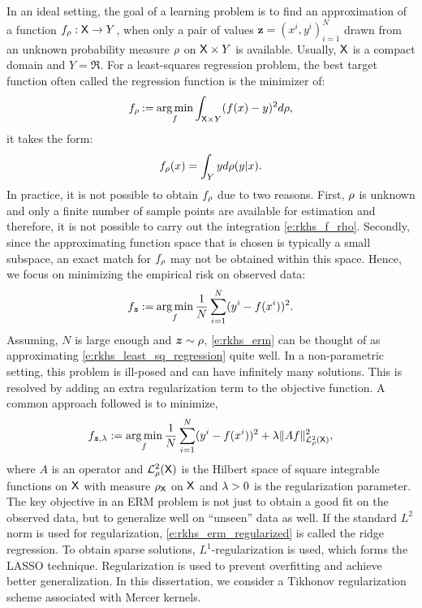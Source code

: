 In an ideal setting, the goal of a learning problem is to find an approximation of a function $f_\rho : {\sf X} \to Y$, when only a pair of values $\bm{z} = (x^i, y^i)_{i=1}^N$ drawn from an unknown probability measure $\rho$ on ${\sf X} \times Y$ is available. Usually, ${\sf X}$ is a compact domain and $Y = \Re$. For a least-squares regression problem, the best target function often called the regression function is the minimizer of:
\begin{equation}
f_\pr \eqdef \argmin_f \int_{\state \times Y} (f(x) - y) ^2 d\pr,
\label{e:rkhs_least_sq_regression}
\end{equation}
it takes the form:
\begin{equation}
f_\pr(x) = \int_Y y d\pr(y|x).
\label{e:rkhs_f_rho}
\end{equation}
In practice, it is not possible to obtain $f_\rho$ due to two reasons. First, $\rho$ is unknown and only a finite number of sample points are available for estimation and therefore, it is not possible to carry out the integration \eqref{e:rkhs_f_rho}. Secondly, since the approximating function space that is chosen is typically a small subspace, an exact match for $f_\rho$ may not be obtained within this space. Hence, we focus on minimizing the empirical risk on observed data:
\begin{equation}
f_{\bm{z}} \eqdef \argmin_f \frac{1}{N} \sum_{i=1}^N (y^i - f(x^i))^2.
\label{e:rkhs_erm}
\end{equation}
Assuming, $N$ is large enough and $\bm{z} \sim \rho$, \eqref{e:rkhs_erm} can be thought of as approximating \eqref{e:rkhs_least_sq_regression} quite well.   In a non-parametric setting, this problem is ill-posed and can have infinitely many solutions. This is resolved by adding an extra regularization term to the objective function. 
A common approach followed is to minimize,
\begin{equation}
f_{\bm{z},\reg} := \argmin_f \frac{1}{N}\sum_{i=1}^N (y^i - f(x^i))^2 + \reg \|A f \|^2_{\mathcal{L}_{\pr}^2(\state)},
\label{e:rkhs_erm_regularized}
\end{equation}
where $A$ is an operator and $\mathcal{L}^2_{\rho}({\sf X})$ is the Hilbert space of square integrable functions on ${\sf X}$ with measure $\rho_{\sf X}$ on ${\sf X}$ and $\lambda>0$ is the regularization parameter. 
The key objective in an ERM problem is not just to obtain a good fit on the observed data, but to generalize well on ``unseen'' data as well. If the standard $L^2$ norm is used for regularization, \eqref{e:rkhs_erm_regularized} is called the ridge regression. To obtain sparse solutions, $L^1$-regularization is used, which forms the LASSO technique. Regularization is used to prevent overfitting and achieve better generalization.   In this dissertation, we consider a Tikhonov regularization scheme \cite{tikars79} associated with Mercer kernels.

